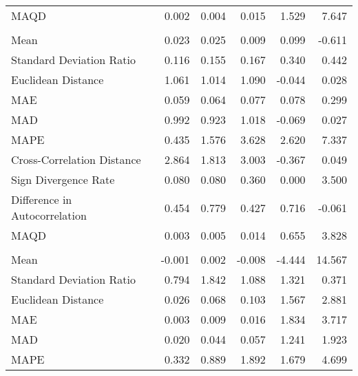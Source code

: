 \begin{landscape}
\begin{ThreePartTable}
\begin{longtable}[t]{lrrrrr}
\hspace{1em}MAQD & 0.002 & 0.004 & 0.015 & 1.529 & 7.647\\
\addlinespace[0.5em]
\multicolumn{6}{l}{\textbf{SVK}}\\
\hline
\hspace{1em}Mean & 0.023 & 0.025 & 0.009 & 0.099 & -0.611\\
\hspace{1em}Standard Deviation Ratio & 0.116 & 0.155 & 0.167 & 0.340 & 0.442\\
\hspace{1em}Euclidean Distance & 1.061 & 1.014 & 1.090 & -0.044 & 0.028\\
\hspace{1em}MAE & 0.059 & 0.064 & 0.077 & 0.078 & 0.299\\
\hspace{1em}MAD & 0.992 & 0.923 & 1.018 & -0.069 & 0.027\\
\hspace{1em}MAPE & 0.435 & 1.576 & 3.628 & 2.620 & 7.337\\
\hspace{1em}Cross-Correlation Distance & 2.864 & 1.813 & 3.003 & -0.367 & 0.049\\
\hspace{1em}Sign Divergence Rate & 0.080 & 0.080 & 0.360 & 0.000 & 3.500\\
\hspace{1em}Difference in Autocorrelation & 0.454 & 0.779 & 0.427 & 0.716 & -0.061\\
\hspace{1em}MAQD & 0.003 & 0.005 & 0.014 & 0.655 & 3.828\\
\addlinespace[0.5em]
\multicolumn{6}{l}{\textbf{SVN}}\\
\hline
\hspace{1em}Mean & -0.001 & 0.002 & -0.008 & -4.444 & 14.567\\
\hspace{1em}Standard Deviation Ratio & 0.794 & 1.842 & 1.088 & 1.321 & 0.371\\
\hspace{1em}Euclidean Distance & 0.026 & 0.068 & 0.103 & 1.567 & 2.881\\
\hspace{1em}MAE & 0.003 & 0.009 & 0.016 & 1.834 & 3.717\\
\hspace{1em}MAD & 0.020 & 0.044 & 0.057 & 1.241 & 1.923\\
\hspace{1em}MAPE & 0.332 & 0.889 & 1.892 & 1.679 & 4.699\\

\end{longtable}
\end{ThreePartTable}
\end{landscape}
